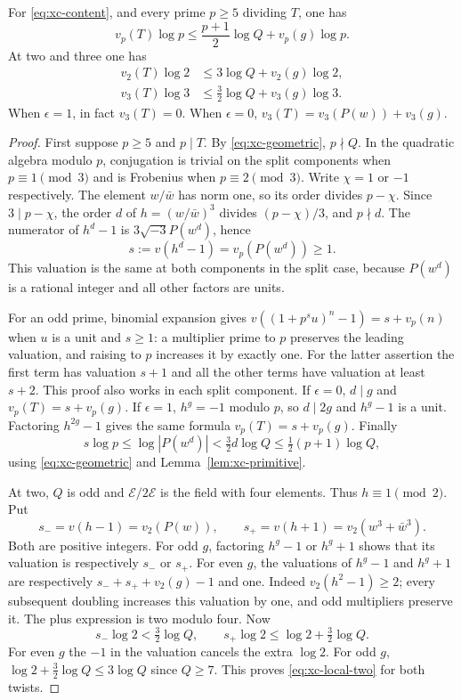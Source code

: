 \begin{theorem}
\label{thm:xc-local}
For \eqref{eq:xc-content}, and every prime $p\ge5$ dividing $T$, one has
\begin{equation}\label{eq:xc-local-large}
 v_p(T)\log p\le\frac{p+1}{2}\log Q+v_p(g)\log p.
\end{equation}
At two and three one has
\begin{align}
 v_2(T)\log2&\le3\log Q+v_2(g)\log2,\label{eq:xc-local-two}\\
 v_3(T)\log3&\le\tfrac32\log Q+v_3(g)\log3.
 \label{eq:xc-local-three}
\end{align}
When $\epsilon=1$, in fact $v_3(T)=0$. When $\epsilon=0$,
$v_3(T)=v_3(P(w))+v_3(g)$.
\end{theorem}
\begin{proof}
First suppose $p\ge5$ and $p\mid T$. By \eqref{eq:xc-geometric}, $p\nmid Q$.
In the quadratic algebra modulo $p$, conjugation is trivial on the split
components when $p\equiv1\pmod3$ and is Frobenius when $p\equiv2\pmod3$.
Write $\chi=1$ or $-1$ respectively. The element $w/\bar w$ has norm one,
so its order divides $p-\chi$. Since $3\mid p-\chi$, the order $d$ of
$h=(w/\bar w)^3$ divides $(p-\chi)/3$, and $p\nmid d$.
The numerator of $h^d-1$ is $3\sqrt{-3}P(w^d)$, hence
\[
 s:=v(h^d-1)=v_p(P(w^d))\ge1.
\]
This valuation is the same at both components in the split case, because
$P(w^d)$ is a rational integer and all other factors are units.

For an odd prime, binomial expansion gives
$v((1+p^s u)^n-1)=s+v_p(n)$ when $u$ is a unit and $s\ge1$:
a multiplier prime to $p$ preserves the leading valuation, and raising to
$p$ increases it by exactly one. For the latter assertion the first term
has valuation $s+1$ and all the other terms have valuation at least $s+2$.
This proof also works in each split component.
If $\epsilon=0$, $d\mid g$ and $v_p(T)=s+v_p(g)$. If $\epsilon=1$,
$h^g=-1$ modulo $p$, so $d\mid2g$ and $h^g-1$ is a unit. Factoring
$h^{2g}-1$ gives the same formula $v_p(T)=s+v_p(g)$.
Finally
\[
 s\log p\le\log|P(w^d)|<\tfrac32d\log Q
 \le\tfrac12(p+1)\log Q,
\]
using \eqref{eq:xc-geometric} and Lemma~\ref{lem:xc-primitive}.

At two, $Q$ is odd and $\mathcal E/2\mathcal E$ is the field with four
 elements. Thus $h\equiv1\pmod2$. Put
\[
 s_-=v(h-1)=v_2(P(w)),\qquad
 s_+=v(h+1)=v_2(w^3+\bar w^3).
\]
Both are positive integers. For odd $g$, factoring $h^g-1$ or
$h^g+1$ shows that its valuation is respectively $s_-$ or $s_+$.
For even $g$, the valuations of $h^g-1$ and $h^g+1$ are respectively
$s_-+s_++v_2(g)-1$ and one. Indeed $v_2(h^2-1)\ge2$; every subsequent
doubling increases this valuation by one, and odd multipliers preserve it.
The plus expression is two modulo four. Now
\[
 s_-\log2<\tfrac32\log Q,\qquad
 s_+\log2\le\log2+\tfrac32\log Q.
\]
For even $g$ the $-1$ in the valuation cancels the extra $\log2$.
For odd $g$, $\log2+\tfrac32\log Q\le3\log Q$ since $Q\ge7$.
This proves \eqref{eq:xc-local-two} for both twists.


\end{proof}
